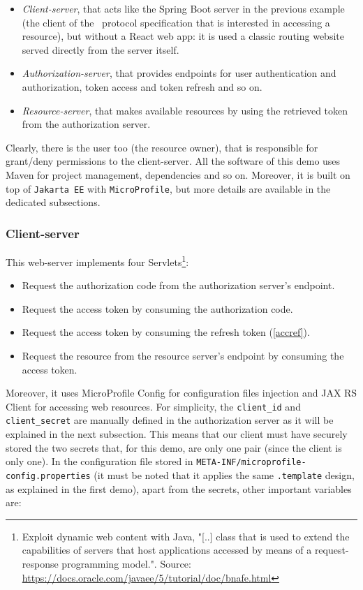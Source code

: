 \begin{itemize}
    \item \textit{Client-server}, that acts like the Spring Boot server in the previous example (the client of the \oauth\ protocol specification that is interested in accessing a resource), but without a React web app: it is used a classic routing website served directly from the server itself.
    \item \textit{Authorization-server}, that provides endpoints for user authentication and authorization, token access and token refresh and so on.
    \item \textit{Resource-server}, that makes available resources by using the retrieved token from the authorization server.
\end{itemize}

Clearly, there is the user too (the resource owner), that is responsible for grant/deny permissions to the client-server. All the software of this demo uses Maven for project management, dependencies and so on. Moreover, it is built on top of \texttt{Jakarta EE} \cite{jaksec} with \texttt{MicroProfile}, but more details are available in the dedicated subsections. 

\subsubsection{Client-server}
This web-server implements four Servlets\footnote{Exploit dynamic web content with Java, "[..] class that is used to extend the capabilities of servers that host applications accessed by means of a request-response programming model.". Source: \url{https://docs.oracle.com/javaee/5/tutorial/doc/bnafe.html}}:

\begin{itemize}
    \item Request the authorization code from the authorization server's endpoint.
    \item Request the access token by consuming the authorization code.
    \item Request the access token by consuming the refresh token (\ref{accref}).
    \item Request the resource from the resource server's endpoint by consuming the access token.
\end{itemize}

\noindent Moreover, it uses MicroProfile Config for configuration files injection and JAX RS Client for accessing web resources. For simplicity, the \texttt{client\_id} and \texttt{client\_secret} are manually defined in the authorization server as it will be explained in the next subsection. This means that our client must have securely stored the two secrets that, for this demo, are only one pair (since the client is only one). In the configuration file stored in \texttt{META-INF/microprofile-config.properties} (it must be noted that it applies the same \texttt{.template} design, as explained in the first demo), apart from the secrets, other important variables are:

